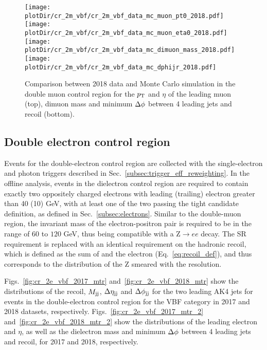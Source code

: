 \begin{figure}[htbp]
    \begin{center}
        \texttt{[image: \\plotDir/cr\_2m\_vbf/cr\_2m\_vbf\_data\_mc\_muon\_pt0\_2018.pdf]}
        \texttt{[image: \\plotDir/cr\_2m\_vbf/cr\_2m\_vbf\_data\_mc\_muon\_eta0\_2018.pdf]}
        \texttt{[image: \\plotDir/cr\_2m\_vbf/cr\_2m\_vbf\_data\_mc\_dimuon\_mass\_2018.pdf]}
        \texttt{[image: \\plotDir/cr\_2m\_vbf/cr\_2m\_vbf\_data\_mc\_dphijr\_2018.pdf]}
    \end{center}
    \caption{Comparison between 2018 data and Monte Carlo simulation in the double muon control region for
        the $p_{\textrm{T}}$ and $\eta$ of the leading muon (top), dimuon mass and minimum $\Delta \phi$ between 4 leading jets and recoil (bottom).}
    \label{fig:cr_2m_vbf_2018_mtr_2}
\end{figure}

\clearpage

\subsection{Double electron control region}
\label{sec:selection_cr_2e}

Events for the double-electron control region are collected with the single-electron and 
photon triggers described in Sec.~\ref{subsec:trigger_eff_reweighting}. In the offline analysis, events in the dielectron 
control region are required to contain exactly two oppositely charged electrons with leading (trailing) 
electron \pt greater than 40 (10) GeV, with at least one of the two passing the tight candidate definition, as defined in Sec.~\ref{subsec:electrons}.
Similar to the double-muon region, the invariant mass of the electron-positron pair is required to be in the range of $60$ to $120$ GeV,
thus being compatible with a $\textrm{Z} \rightarrow ee$ decay. 
The SR \ptmiss requirement is replaced with an identical requirement on the hadronic recoil, which is defined as the 
sum of \ptvecmiss and the electron \vpt (Eq.~\ref{eq:recoil_def}), and thus corresponds to the distribution of the Z \pt smeared with the \ptmiss resolution. 

Figs.~\ref{fig:cr_2e_vbf_2017_mtr} and~\ref{fig:cr_2e_vbf_2018_mtr} show the distributions of the recoil, $M_{\textrm{jj}}$, $\Delta \eta_{\textrm{jj}}$ and
$\Delta \phi_{\textrm{jj}}$ for the two leading AK4 jets for events in the double-electron control region for the VBF category 
in 2017 and 2018 datasets, respectively. 
Figs.~\ref{fig:cr_2e_vbf_2017_mtr_2} and~\ref{fig:cr_2e_vbf_2018_mtr_2} show the distributions of the leading electron \pt and $\eta$, 
as well as the dielectron mass and minimum $\Delta \phi$ between 4 leading jets and recoil, for 2017 and 2018, respectively.

